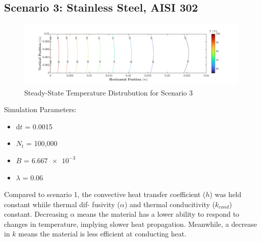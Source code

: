 \documentclass{article}
\begin{document}
\subsection{Scenario 3: Stainless Steel, AISI 302}

\begin{figure}[h]
    \centering
    \includegraphics[width=1\textwidth]{fig/contour3.png}
    \caption{Steady-State Temperature Distrubution for Scenario 3}
    \label{fig: Plot3}
\end{figure}

Simulation Parameters:
\begin{itemize}
    \item d$t$ = 0.0015
    \item $N_t$ = 100,000
    \item $B$ = $\SI{6.667e-3}{}$
    \item $\lambda$ = 0.06
\end{itemize}

Compared to scenario 1, the convective heat transfer coefficient ($h$) was held constant whiile thermal dif-
fusivity ($\alpha$) and thermal conducitivity ($k_{cond}$) constant. Decreasing $\alpha$ means the material has a lower ability to respond to changes in temperature, implying slower heat propagation. Meanwhile, a decrease in $k$ means the material is less efficient at conducting heat.  \\
\end{document}

